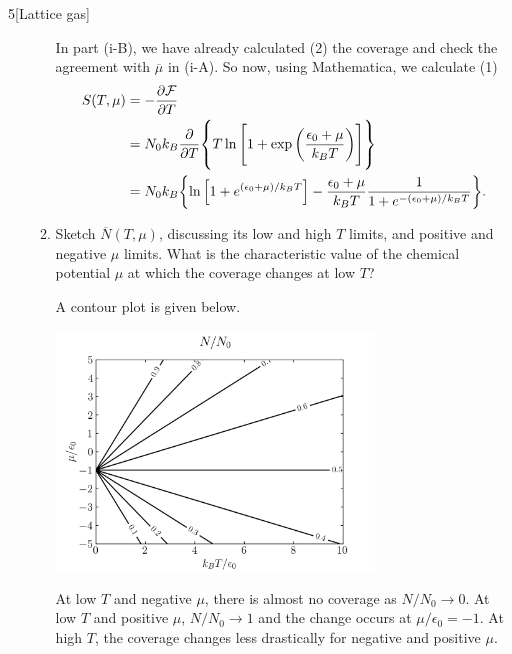 \documentclass[12pt]{article}
\begin{document}
\begin{problem}{5}[Lattice gas]
\begin{enumerate}[label=(\alph*)]
\begin{enumerate}[label=(\roman*)]
\begin{solution}
In part (i-B), we have already calculated (2) the coverage and check the
agreement with $\overline\mu$ in (i-A). So now, using Mathematica, we 
calculate (1)
\begin{align}
    S(T,\mu)
    &=-\frac{\partial\mathcal{F}}{\partial T}\notag\\
    &=N_0k_B\frac{\partial}{\partial
    T}\qty{T\ln\qty[1+\exp\qty(\frac{\epsilon_0+\mu}{k_BT})]}\notag\\
    &=N_0k_B\qty{\ln\qty[1+e^{(\epsilon_0+\mu)/k_BT}]-\frac{\epsilon_0+\mu}{k_BT}\frac{1}{1+e^{-(\epsilon_0+\mu)/k_BT}}}.
\end{align}
\end{solution}

\item Sketch $\overline{N}(T,\mu)$, discussing its low and high $T$ limits, and
    positive and negative $\mu$ limits. What is the characteristic value of the
    chemical potential $\mu$ at which the coverage changes at low $T$?
\begin{solution}
A contour plot is given below.
\begin{center}
    \includegraphics[width=0.7\textwidth]{p5a.png}
\end{center}
At low $T$ and negative $\mu$, there is almost no coverage as $N/N_0\to0$. At
low $T$ and positive $\mu$, $N/N_0\to1$ and the change occurs at
$\mu/\epsilon_0=-1$. At high $T$, the coverage changes less drastically for
negative and positive $\mu$.
\end{solution}


\end{enumerate}
\end{enumerate}
\end{problem}
\end{document}
